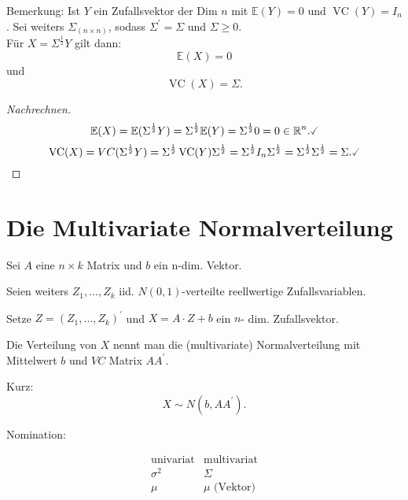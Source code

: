 \documentclass{tstextbook}
\DeclareMathOperator{\VC}{VC}
\newcommand{\E}{\mathbb E}
\newcommand{\R}{\mathbb R}
\begin{document}
	\begin{remark}
		Bemerkung: Ist $ Y $ ein Zufallsvektor der Dim $ n $ mit $ \E(Y) = 0 $ und $ \VC(Y) = I_n $. Sei weiters $ \Sigma_{(n \times n)} $, sodass $ \Sigma^\prime = \Sigma $ und $ \Sigma \ge 0 $. \\
		Für $ X = \Sigma^{\frac{1}{2}} Y $ gilt dann: \[ \E(X) = 0 \] und \[ \VC(X) = \Sigma. \]
	\end{remark}
	
	\begin{proof}[Nachrechnen]
		\[
		\E(X) = \E(\Sigma^{\frac{1}{2}} Y) = \Sigma^{\frac{1}{2}} \E(Y) = \Sigma^{\frac{1}{2}} 0 = 0 \in \R^n. \checked
		\]
		\[ \VC(X) = VC(\Sigma^{\frac{1}{2}} Y) = \Sigma^{\frac{1}{2}} \VC(Y) \Sigma^{\frac{1}{2}} = \Sigma^{\frac{1}{2}} I_n \Sigma^{\frac{1}{2}} = \Sigma^{\frac{1}{2}} \Sigma^{\frac{1}{2}} = \Sigma. \checked \]
	\end{proof}
	
\section{Die Multivariate Normalverteilung}


\begin{definition}
	Sei $A$ eine $n\times k$ Matrix und $b$ ein n-dim. Vektor. 
	
	Seien weiters $Z_{1},\ldots,Z_{k}$ iid. $N(0,1)$-verteilte reellwertige Zufallsvariablen. 
	
	Setze $Z=\left(Z_{1},\ldots,Z_{k}\right)^{\prime}$ und $X=A\cdot Z+b$
	ein $n$- dim. Zufallsvektor.
	
	Die Verteilung von $X$ nennt man die (multivariate) Normalverteilung
	mit Mittelwert $b$ und $VC$ Matrix $AA^{\prime}.$
	
	Kurz: 
	\[
	X\sim N(b,AA^{\prime}).
	\]
	
	Nomination:
	
	\[
	\begin{array}{cc}
		\text{univariat} & \text{multivariat}\\
		\sigma^{2} & \Sigma\\
		\mu & \mu\text{ (Vektor)}
	\end{array}
	\]
	\end{definition}
\end{document}
